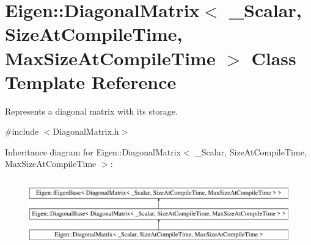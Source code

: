 \hypertarget{class_eigen_1_1_diagonal_matrix}{}\section{Eigen\+::Diagonal\+Matrix$<$ \+\_\+\+Scalar, Size\+At\+Compile\+Time, Max\+Size\+At\+Compile\+Time $>$ Class Template Reference}
\label{class_eigen_1_1_diagonal_matrix}


Represents a diagonal matrix with its storage.  




{\ttfamily \#include $<$Diagonal\+Matrix.\+h$>$}

Inheritance diagram for Eigen\+::Diagonal\+Matrix$<$ \+\_\+\+Scalar, Size\+At\+Compile\+Time, Max\+Size\+At\+Compile\+Time $>$\+:\begin{figure}[H]
\begin{center}
\leavevmode
\includegraphics[height=2.952548cm]{class_eigen_1_1_diagonal_matrix}
\end{center}
\end{figure}
